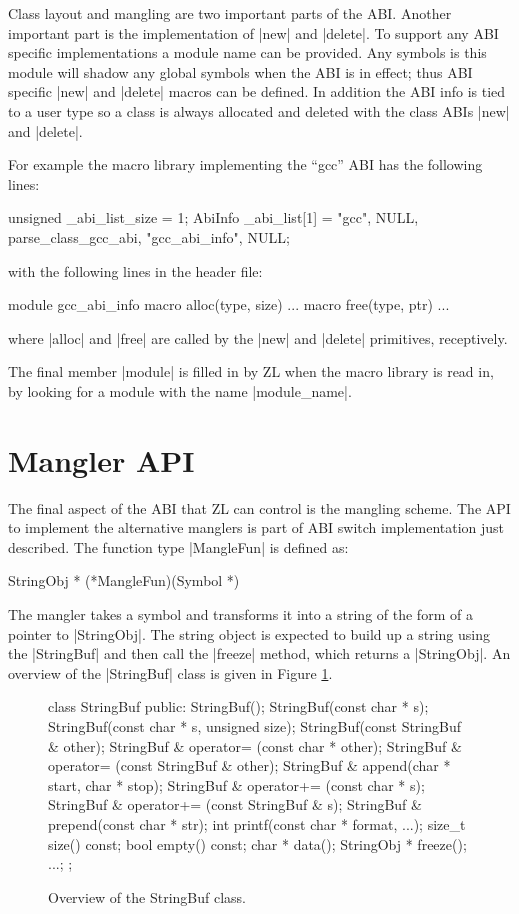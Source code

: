 Class layout and mangling are two important parts of the ABI.
Another important part is the implementation of |new| and |delete|.
To support any ABI specific implementations a module name can be
provided.  Any symbols is this module will shadow any global symbols
when the ABI is in effect; thus ABI specific |new| and |delete| macros
can be defined.  In addition the ABI info is tied to a user type so a
class is always allocated and deleted with the class ABIs |new| and
|delete|.

For example the macro library implementing the ``gcc'' ABI has the
following lines:
\begin{code}
unsigned _abi_list_size = 1;
AbiInfo _abi_list[1] = {{"gcc", NULL, parse_class_gcc_abi, 
                         "gcc_abi_info", NULL}};
\end{code}
with the following lines in the header file:
\begin{code}
module gcc_abi_info {
  macro alloc(type, size) {...}
  macro free(type, ptr) {...}
}
\end{code}
where |alloc| and |free| are called by the |new| and |delete|
primitives, receptively.

The final member |module| is filled in by ZL when the macro library
is read in, by looking for a module with the name |module_name|.

\section{Mangler API}

The final aspect of the ABI that ZL can control is the mangling
scheme.  The API to implement the alternative manglers is part of ABI
switch implementation just described.  The function type |MangleFun|
is defined as:
\begin{code}
StringObj * (*MangleFun)(Symbol *)
\end{code}

The mangler takes a symbol and transforms it into a string of the form
of a pointer to |StringObj|.  The string object is expected to build
up a string using the |StringBuf| and then call the |freeze| method,
which returns a |StringObj|.  An overview of the |StringBuf| class is
given in Figure \ref{StringBuf}.

\begin{figure}
\begin{codef}
class StringBuf {
public:
    StringBuf();
    StringBuf(const char * s);
    StringBuf(const char * s, unsigned size);
    StringBuf(const StringBuf & other);
    StringBuf & operator= (const char * other);
    StringBuf & operator= (const StringBuf & other);
    StringBuf & append(char * start, char * stop);
    StringBuf & operator+= (const char * s);
    StringBuf & operator+= (const StringBuf & s);
    StringBuf & prepend(const char * str);
    int printf(const char * format, ...);
    size_t size() const;
    bool empty() const;
    char * data();
    StringObj * freeze();
    ...;
};
\end{codef}
\caption{Overview of the StringBuf class.}
\label{StringBuf}
\end{figure}

